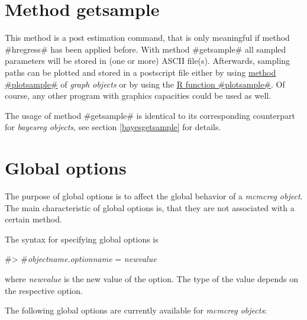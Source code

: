 \section{Method getsample}
\label{mcmcgetsample} 


This method is a post estimation command, that is only meaningful if
method #hregress# has been applied before. With method #getsample#
all sampled parameters will be stored in (one or more) ASCII
file(s). Afterwards, sampling paths can be plotted and stored in a
postscript file either by using \hyperref[graphplotsample]{method
#plotsample#} of {\em graph objects} or by using the
\hyperref[rpackage]{R function #plotsample#}. Of
course, any other program with graphics capacities could be used as
well.

The usage of method #getsample# is identical to its corresponding counterpart for {\em
bayesreg objects}, see section \ref{bayesgetsample} for details.


\section{Global options}
\label{mcmcregglobopt} 

The purpose of global options is to affect the global behavior of
a {\em mcmcreg object}. The main characteristic of global options
is, that they are not associated with a certain method.

The syntax for specifying global options is

#> #{\em objectname}.{\em optionname} = {\em newvalue}

where {\em newvalue} is the new value of the option. The type of
the value depends on the respective option.

The following global options are currently available for {\em
mcmcreg objects}:

